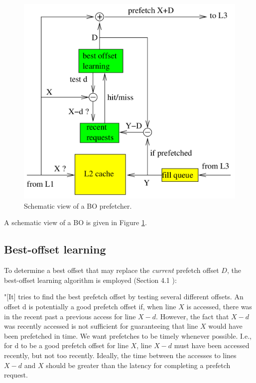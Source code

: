 \documentclass[conference]{IEEEtran}
\begin{document}
\begin{figure}
    \centering
    \includegraphics[width=1.0\columnwidth]{figures/michaud_bop_2016_schematic_view_of_bo_prefetcher.png}
    \caption{Schematic view of a BO prefetcher. \cite{BOP_2016}}
    \label{fig:bo-schematic}
\end{figure}


A schematic view of a BO is given in Figure \ref{fig:bo-schematic}.

\subsection{Best-offset learning}

To determine a best offset that may replace the \textit{current} prefetch offset $D$,
the best-offset learning algorithm is employed (Section 4.1 \cite{BOP_2016}): 

"[It] tries to find the best prefetch offset by testing several different offsets.
An offset d is potentially a good prefetch offset if,
when line $X$ is accessed,
there was in the recent past a previous access for line $X - d$.
However, the fact that $X - d$ was recently accessed
is not sufficient for guaranteeing that line $X$ would have been prefetched in time.
We want prefetches to be timely whenever possible.
I.e., for d to be a good prefetch offset for line $X$,
line $X - d$ must have been accessed recently, but not too recently.
Ideally, the time between the accesses to lines $X - d$ and $X$
should be greater than the latency for completing a prefetch request.
\end{document}
